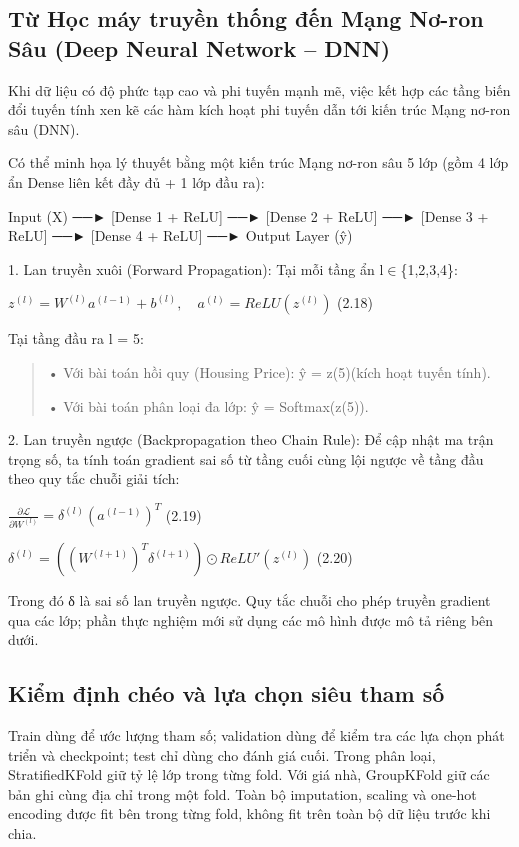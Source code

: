 \subsection{Từ Học máy truyền thống đến Mạng Nơ-ron Sâu (Deep Neural Network -- DNN)}\label{tux1eeb-hux1ecdc-muxe1y-truyux1ec1n-thux1ed1ng-ux111ux1ebfn-mux1ea1ng-nux1a1-ron-suxe2u-deep-neural-network-dnn}

Khi dữ liệu có độ phức tạp cao và phi tuyến mạnh mẽ, việc kết hợp các
tầng biến đổi tuyến tính xen kẽ các hàm kích hoạt phi tuyến dẫn tới kiến
trúc Mạng nơ-ron sâu (DNN).

Có thể minh họa lý thuyết bằng một kiến trúc Mạng nơ-ron sâu 5 lớp (gồm
4 lớp ẩn Dense liên kết đầy đủ + 1 lớp đầu ra):

Input (X) ──► {[}Dense 1 + ReLU{]} ──► {[}Dense 2 + ReLU{]} ──► {[}Dense
3 + ReLU{]} ──► {[}Dense 4 + ReLU{]} ──► Output Layer (ŷ)

1. Lan truyền xuôi (Forward Propagation): Tại mỗi tầng ẩn l\ensuremath{\in}\{1,2,3,4\}:

\(z^{(l)} = W^{(l)}a^{(l - 1)} + b^{(l)},\quad a^{(l)} = ReLU(z^{(l)})\)
(2.18)

Tại tầng đầu ra l = 5:

\begin{quote}
• Với bài toán hồi quy (Housing Price): ŷ = z(5)(kích hoạt tuyến tính).

• Với bài toán phân loại đa lớp: ŷ = Softmax(z(5)).
\end{quote}

2. Lan truyền ngược (Backpropagation theo Chain Rule): Để cập nhật ma
trận trọng số, ta tính toán gradient sai số từ tầng cuối cùng lội ngược
về tầng đầu theo quy tắc chuỗi giải tích:

\(\frac{\partial\mathcal{L}}{\partial W^{(l)}} = \delta^{(l)}(a^{(l - 1)})^{T}\)
(2.19)

\(\delta^{(l)} = ((W^{(l + 1)})^{T}\delta^{(l + 1)}) \odot {ReLU}'(z^{(l)})\)
(2.20)

Trong đó δ là sai số lan truyền ngược. Quy tắc chuỗi cho phép truyền
gradient qua các lớp; phần thực nghiệm mới sử dụng các mô hình được mô
tả riêng bên dưới.

\subsection{Kiểm định chéo và lựa chọn siêu tham số}\label{kiux1ec3m-ux111ux1ecbnh-chuxe9o-vuxe0-lux1ef1a-chux1ecdn-siuxeau-tham-sux1ed1}

Train dùng để ước lượng tham số; validation dùng để kiểm tra các lựa
chọn phát triển và checkpoint; test chỉ dùng cho đánh giá cuối. Trong
phân loại, StratifiedKFold giữ tỷ lệ lớp trong từng fold. Với giá nhà,
GroupKFold giữ các bản ghi cùng địa chỉ trong một fold. Toàn bộ
imputation, scaling và one-hot encoding được fit bên trong từng fold,
không fit trên toàn bộ dữ liệu trước khi chia.


